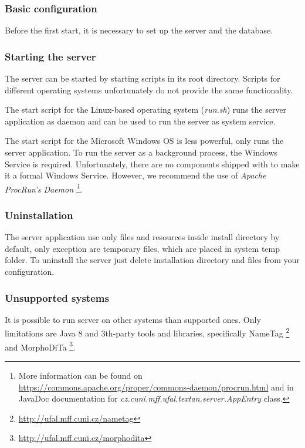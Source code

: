 \subsubsection{Basic configuration}

Before the first start, it is necessary to set up the server and the database.



\subsubsection{Starting the server}

The server can be started by starting scripts in its root directory. Scripts for
different operating systems unfortunately do not provide the same functionality.

The start script for the Linux-based operating system (\emph{run.sh}) runs the
server application as daemon and can be used to run the server as system service.

The start script for the Microsoft Windows OS is less powerful, only runs the
server application. To run the server as a background process, the Windows Service
is required. Unfortunately, there are no components shipped with \textan{}
to make it a formal Windows Service. However, we recommend the use of \emph{Apache
ProcRun's Daemon \footnote{More information can be found on
\url{https://commons.apache.org/proper/commons-daemon/procrun.html} and in JavaDoc
documentation for \emph{cz.cuni.mff.ufal.textan.server.AppEntry} class.}}.

\subsubsection{Uninstallation}
The server application use only files and resources inside install directory by
default, only exception are temporary files, which are placed in system temp folder.
To uninstall the server just delete installation directory and files from your
configuration.

\subsubsection{Unsupported systems}
\label{sssec:unsupport}
It is possible to run \textan{} server on other systems than supported ones. Only
limitations are Java 8 and 3th-party tools and libraries, specifically NameTag%
\footnote{\url{http://ufal.mff.cuni.cz/nametag}} and MorphoDiTa%
\footnote{\url{http://ufal.mff.cuni.cz/morphodita}}.

